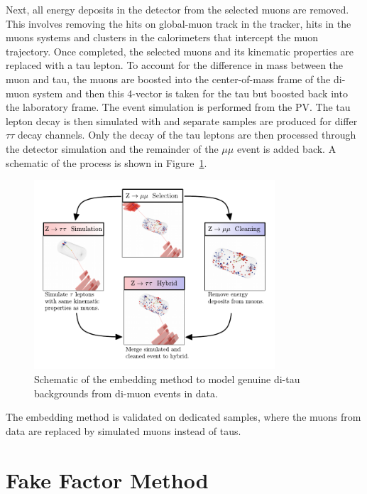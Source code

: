 Next, all energy deposits in the detector from the selected muons are removed.
This involves removing the hits on global-muon track in the tracker, hits in the muons systems and clusters in the calorimeters that intercept the muon trajectory.
Once completed, the selected muons and its kinematic properties are replaced with a tau lepton.
To account for the difference in mass between the muon and tau, the muons are boosted into the center-of-mass frame of the di-muon system and then this 4-vector is taken for the tau but boosted back into the laboratory frame.
The event simulation is performed from the PV.
The tau lepton decay is then simulated with \PYTHIA and separate samples are produced for differ $\tau\tau$ decay channels.
Only the decay of the tau leptons are then processed through the detector simulation and the remainder of the $\mu\mu$ event is added back.
A schematic of the process is shown in Figure~\ref{fig:embedding}. \\

\begin{figure}[!hbtp]
\centering
    \includegraphics[width=0.8\textwidth]{Figures/Embedding_Diagram.pdf}
\caption{Schematic of the embedding method to model genuine di-tau backgrounds from di-muon events in data.}
\label{fig:embedding}
\end{figure}

The embedding method is validated on dedicated samples, where the muons from data are replaced by simulated muons instead of taus.

\newpage
\section{Fake Factor Method}
\label{sec:ff}

